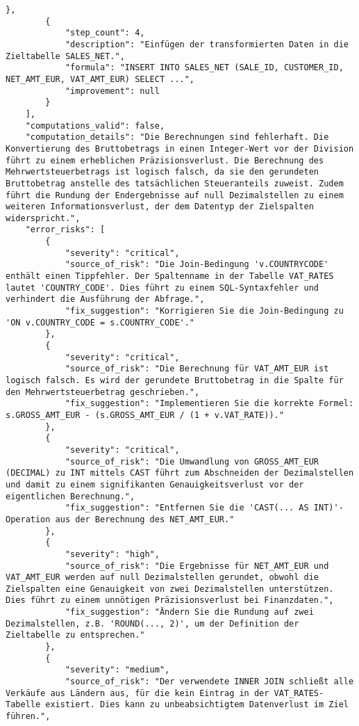 \begin{lstlisting}[caption={Ausgabe: Gemini 2.5 Pro Anwendungsfall 5 Robustheitsdurchlauf},label={gemini_case5_prompt3}]
        },
        {
            "step_count": 4,
            "description": "Einfügen der transformierten Daten in die Zieltabelle SALES_NET.",
            "formula": "INSERT INTO SALES_NET (SALE_ID, CUSTOMER_ID, NET_AMT_EUR, VAT_AMT_EUR) SELECT ...",
            "improvement": null
        }
    ],
    "computations_valid": false,
    "computation_details": "Die Berechnungen sind fehlerhaft. Die Konvertierung des Bruttobetrags in einen Integer-Wert vor der Division führt zu einem erheblichen Präzisionsverlust. Die Berechnung des Mehrwertsteuerbetrags ist logisch falsch, da sie den gerundeten Bruttobetrag anstelle des tatsächlichen Steueranteils zuweist. Zudem führt die Rundung der Endergebnisse auf null Dezimalstellen zu einem weiteren Informationsverlust, der dem Datentyp der Zielspalten widerspricht.",
    "error_risks": [
        {
            "severity": "critical",
            "source_of_risk": "Die Join-Bedingung 'v.COUNTRYCODE' enthält einen Tippfehler. Der Spaltenname in der Tabelle VAT_RATES lautet 'COUNTRY_CODE'. Dies führt zu einem SQL-Syntaxfehler und verhindert die Ausführung der Abfrage.",
            "fix_suggestion": "Korrigieren Sie die Join-Bedingung zu 'ON v.COUNTRY_CODE = s.COUNTRY_CODE'."
        },
        {
            "severity": "critical",
            "source_of_risk": "Die Berechnung für VAT_AMT_EUR ist logisch falsch. Es wird der gerundete Bruttobetrag in die Spalte für den Mehrwertsteuerbetrag geschrieben.",
            "fix_suggestion": "Implementieren Sie die korrekte Formel: s.GROSS_AMT_EUR - (s.GROSS_AMT_EUR / (1 + v.VAT_RATE))."
        },
        {
            "severity": "critical",
            "source_of_risk": "Die Umwandlung von GROSS_AMT_EUR (DECIMAL) zu INT mittels CAST führt zum Abschneiden der Dezimalstellen und damit zu einem signifikanten Genauigkeitsverlust vor der eigentlichen Berechnung.",
            "fix_suggestion": "Entfernen Sie die 'CAST(... AS INT)'-Operation aus der Berechnung des NET_AMT_EUR."
        },
        {
            "severity": "high",
            "source_of_risk": "Die Ergebnisse für NET_AMT_EUR und VAT_AMT_EUR werden auf null Dezimalstellen gerundet, obwohl die Zielspalten eine Genauigkeit von zwei Dezimalstellen unterstützen. Dies führt zu einem unnötigen Präzisionsverlust bei Finanzdaten.",
            "fix_suggestion": "Ändern Sie die Rundung auf zwei Dezimalstellen, z.B. 'ROUND(..., 2)', um der Definition der Zieltabelle zu entsprechen."
        },
        {
            "severity": "medium",
            "source_of_risk": "Der verwendete INNER JOIN schließt alle Verkäufe aus Ländern aus, für die kein Eintrag in der VAT_RATES-Tabelle existiert. Dies kann zu unbeabsichtigtem Datenverlust im Ziel führen.",

\end{lstlisting}
